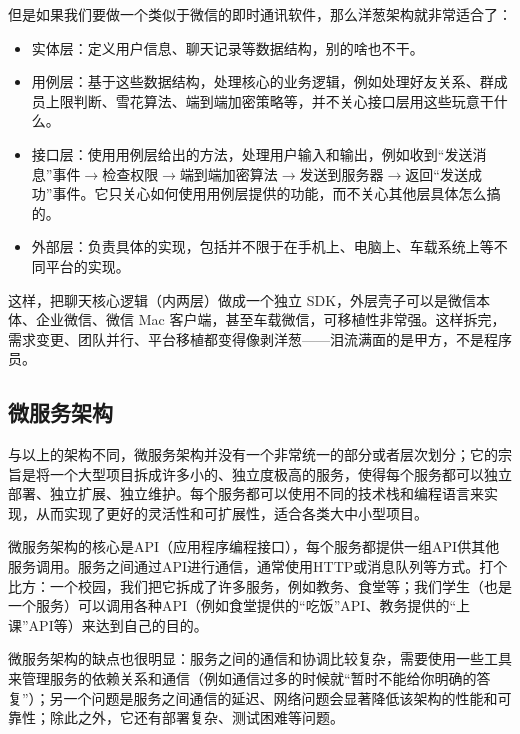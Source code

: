 \documentclass[../main.tex]{subfiles}
\begin{document}
但是如果我们要做一个类似于微信的即时通讯软件，那么洋葱架构就非常适合了：
\begin{itemize}
    \item 实体层：定义用户信息、聊天记录等数据结构，别的啥也不干。
    \item 用例层：基于这些数据结构，处理核心的业务逻辑，例如处理好友关系、群成员上限判断、雪花算法、端到端加密策略等，并不关心接口层用这些玩意干什么。
    \item 接口层：使用用例层给出的方法，处理用户输入和输出，例如收到“发送消息”事件$\rightarrow$检查权限$\rightarrow$端到端加密算法$\rightarrow$发送到服务器$\rightarrow$返回“发送成功”事件。它只关心如何使用用例层提供的功能，而不关心其他层具体怎么搞的。
    \item 外部层：负责具体的实现，包括并不限于在手机上、电脑上、车载系统上等不同平台的实现。
\end{itemize}

这样，把聊天核心逻辑（内两层）做成一个独立 SDK，外层壳子可以是微信本体、企业微信、微信 Mac 客户端，甚至车载微信，可移植性非常强。这样拆完，需求变更、团队并行、平台移植都变得像剥洋葱——泪流满面的是甲方，不是程序员。

\subsection{微服务架构}

与以上的架构不同，微服务架构并没有一个非常统一的部分或者层次划分；它的宗旨是将一个大型项目拆成许多小的、独立度极高的服务，使得每个服务都可以独立部署、独立扩展、独立维护。每个服务都可以使用不同的技术栈和编程语言来实现，从而实现了更好的灵活性和可扩展性，适合各类大中小型项目。

微服务架构的核心是API（应用程序编程接口），每个服务都提供一组API供其他服务调用。服务之间通过API进行通信，通常使用HTTP或消息队列等方式。打个比方：一个校园，我们把它拆成了许多服务，例如教务、食堂等；我们学生（也是一个服务）可以调用各种API（例如食堂提供的“吃饭”API、教务提供的“上课”API等）来达到自己的目的。

微服务架构的缺点也很明显：服务之间的通信和协调比较复杂，需要使用一些工具来管理服务的依赖关系和通信（例如通信过多的时候就“暂时不能给你明确的答复”）；另一个问题是服务之间通信的延迟、网络问题会显著降低该架构的性能和可靠性；除此之外，它还有部署复杂、测试困难等问题。
\end{document}
